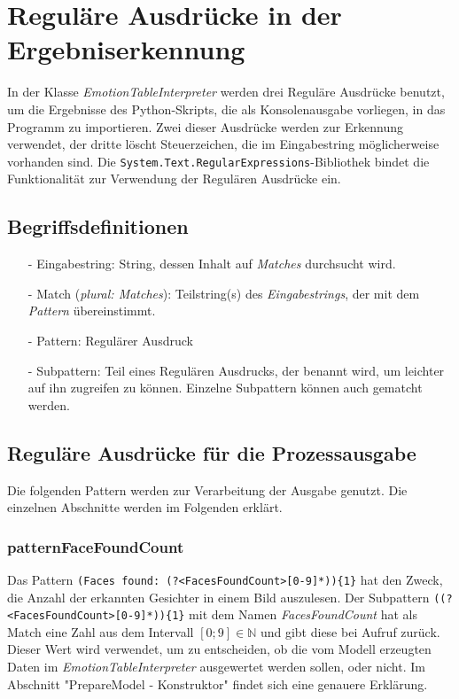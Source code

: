 \documentclass[10pt,a4paper]{report}
\begin{document}
\section{Reguläre Ausdrücke in der Ergebniserkennung}
In der Klasse \textit{EmotionTableInterpreter} werden drei Reguläre Ausdrücke benutzt, um die Ergebnisse des Python-Skripts, die als Konsolenausgabe vorliegen, in das Programm zu importieren. Zwei dieser Ausdrücke werden zur Erkennung verwendet, der dritte löscht Steuerzeichen, die im Eingabestring möglicherweise vorhanden sind. Die \texttt{System.Text.RegularExpressions}-Bibliothek bindet die Funktionalität zur Verwendung der Regulären Ausdrücke ein.
\subsection{Begriffsdefinitionen}
\begin{itemize}
\item[-] Eingabestring: String, dessen Inhalt auf \textit{Matches} durchsucht wird.
\item[-] Match (\textit{plural: Matches}): Teilstring(s) des \textit{Eingabestrings}, der mit dem \textit{Pattern} übereinstimmt.
\item[-] Pattern: Regulärer Ausdruck
\item[-] Subpattern: Teil eines Regulären Ausdrucks, der benannt wird, um leichter auf ihn zugreifen zu können. Einzelne Subpattern können auch gematcht werden. 
\end{itemize}
\subsection{Reguläre Ausdrücke für die Prozessausgabe}
Die folgenden Pattern werden zur Verarbeitung der Ausgabe genutzt. Die einzelnen Abschnitte werden im Folgenden erklärt.
\subsubsection{patternFaceFoundCount}
Das Pattern \texttt{(Faces found:  (?<FacesFoundCount>[0-9]*))\{1\}} hat den Zweck, die Anzahl der erkannten Gesichter in einem Bild auszulesen. Der Subpattern \texttt{((?<FacesFoundCount>[0-9]*))\{1\}} mit dem Namen \textit{FacesFoundCount} hat als Match eine Zahl aus dem Intervall $\left[0;9\right] \in \mathbb{N}$ und gibt diese bei Aufruf zurück. Dieser Wert wird verwendet, um zu entscheiden, ob die vom Modell erzeugten Daten im \textit{EmotionTableInterpreter} ausgewertet werden sollen, oder nicht. Im Abschnitt "PrepareModel - Konstruktor" findet sich eine genauere Erklärung.
\end{document}
